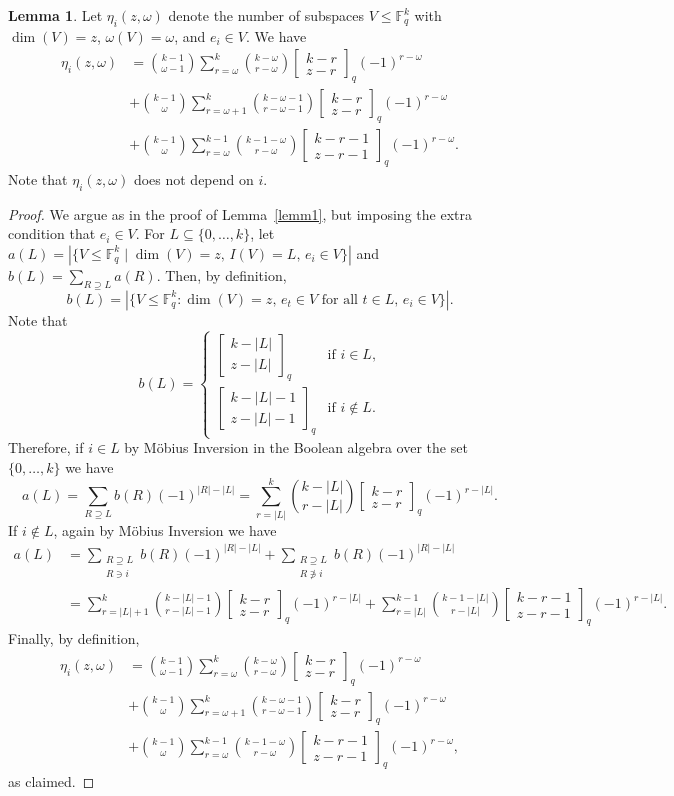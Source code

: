 \documentclass[11pt,a4paper,reqno,twoside]{amsart}
\theoremstyle{definition}
\newtheorem{lemma}{Lemma}
\newcommand{\F}{\mathbb{F}}
\newcommand\qbin[3]{\left[\begin{matrix} #1 \\ #2 \end{matrix}\right]_{#3}}
\begin{document}
\begin{appendix}
\begin{lemma}\label{lemm2}
    Let $\eta_i(z,\omega)$ denote the number of subspaces $V \le \F_q^k$ with $\dim(V)=z$,  $\omega(V)=\omega$, and $e_i \in V$. We have    \begin{align*}\eta_i(z,\omega)&= \binom{k-1}{\omega-1}\sum_{r=\omega}^k \binom{k-\omega}{r-\omega}\qbin{k-r}{z-r}{q}(-1)^{r-\omega} \\
&
+\binom{k-1}{\omega}\sum_{r=\omega+1}^k \binom{k-\omega-1}{r-\omega-1}\qbin{k-r}{z-r}{q}(-1)^{r-\omega} \\
&+ 
\binom{k-1}{\omega}\sum_{r=\omega}^{k-1} \binom{k-1-\omega}{r-\omega}\qbin{k-r-1}{z-r-1}{q}(-1)^{r-\omega}.
\end{align*}
Note that $\eta_i(z,\omega)$ does not depend on $i$.
\end{lemma}
\begin{proof}
We argue as in the proof of Lemma~\ref{lemm1}, but imposing the extra condition that $e_i \in V$. For $L \subseteq \{0, \ldots, k\}$, let
$a(L)=|\{V \le \F_q^k \mid \dim(V)=z, \, I(V)=L, \, e_i \in V\}|$ and 
$b(L)=\sum_{R \supseteq L} a(R)$.
Then, by definition, $$b(L)=|\{V \le \F_q^k : \dim(V)=z, \, e_t \in V \mbox{ for all } t \in L, \, e_i \in V\}|.$$
Note that
$$b(L) = \begin{cases}
    \qbin{k-|L|}{z-|L|}{q} & \mbox{if $i \in L$,} \\ 
    \qbin{k-|L|-1}{z-|L|-1}{q} & \mbox{if $i \notin L$.}    
\end{cases}$$
Therefore, if $i \in L$ by Möbius Inversion in the Boolean algebra over the set $\{0, \ldots, k\}$ we  have
$$a(L)=\sum_{R \supseteq L} b(R)(-1)^{|R|-|L|}
=\sum_{r=|L|}^k \binom{k-|L|}{r-|L|}\qbin{k-r}{z-r}{q}(-1)^{r-|L|}.$$
If $i \notin L$, again by Möbius Inversion we have
\begin{align*}
a(L) &= \sum_{\substack{R \supseteq L \\ R \ni i}}
b(R) (-1)^{|R|-|L|} + \sum_{\substack{R \supseteq L \\ R \not\ni i}}
b(R) (-1)^{|R|-|L|} \\
&= \sum_{r=|L|+1}^k \binom{k-|L|-1}{r-|L|-1}\qbin{k-r}{z-r}{q}(-1)^{r-|L|}
+
\sum_{r=|L|}^{k-1} \binom{k-1-|L|}{r-|L|}\qbin{k-r-1}{z-r-1}{q}(-1)^{r-|L|}.
\end{align*}
Finally, by definition,
\begin{align*}
\eta_i(z,\omega)&= \binom{k-1}{\omega-1}\sum_{r=\omega}^k \binom{k-\omega}{r-\omega}\qbin{k-r}{z-r}{q}(-1)^{r-\omega} \\
&
+\binom{k-1}{\omega}\sum_{r=\omega+1}^k \binom{k-\omega-1}{r-\omega-1}\qbin{k-r}{z-r}{q}(-1)^{r-\omega} \\
&+ 
\binom{k-1}{\omega}\sum_{r=\omega}^{k-1} \binom{k-1-\omega}{r-\omega}\qbin{k-r-1}{z-r-1}{q}(-1)^{r-\omega},
\end{align*}
as claimed.
\end{proof}


\end{appendix}
\end{document}
